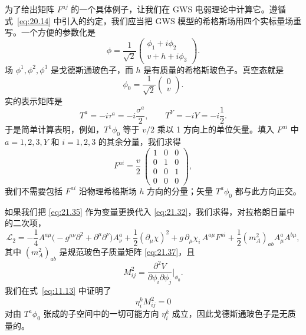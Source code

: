 为了给出矩阵 $F^{aj}$ 的一个具体例子，让我们在 GWS 电弱理论中计算它。遵循式~\eqref{eq:20.14} 中引入的约定，我们应当把 GWS 模型的希格斯场用四个实标量场重写。一个方便的参数化是
\begin{equation}
  \phi = \frac{1}{\sqrt{2}}\begin{pmatrix}
    \phi_1 + i\phi_2\\
    v + h + i\phi_3
  \end{pmatrix} .
  \label{eq:21.38}
\end{equation}
场 $\phi^1, \phi^2, \phi^3$ 是戈德斯通玻色子，而 $h$ 是有质量的希格斯玻色子。真空态就是
\begin{equation}
  \phi_0 = \frac{1}{\sqrt{2}}\begin{pmatrix}0\\ v\end{pmatrix} .
\end{equation}
实的表示矩阵是
\begin{equation}
  T^a = -i\tau^a = -i\frac{\sigma^a}{2},\qquad
  T^Y = -iY = -i\frac{1}{2} .
\end{equation}
于是简单计算表明，例如，$T^1\phi_0$ 等于 $v/2$ 乘以 1 方向上的单位矢量。填入 $F^{ai}$ 中 $a = 1, 2, 3, Y$ 和 $i = 1, 2, 3$ 的其余分量，我们求得
\begin{equation}
  F^{ai} = \frac{v}{2}\ \begin{pmatrix}
    1 & 0 & 0\\
    0 & 1 & 0\\
    0 & 0 & 1\\
    0 & 0 & 0
  \end{pmatrix},
  \label{eq:21.39}
\end{equation}
我们不需要包括 $F^{ai}$ 沿物理希格斯场 $h$ 方向的分量；矢量 $T^a\phi_0$ 都与此方向正交。

如果我们把 \eqref{eq:21.35} 作为变量更换代入 \eqref{eq:21.32}，我们求得，对拉格朗日量中的二次项，
\begin{equation}
  \mathcal{L}_2 = -\frac{1}{4}A^{a\mu}\bigl( -g^{\mu\nu}\partial^2
    + \partial^\mu\partial^\nu \bigr)A^a_\nu + \frac{1}{2}(\partial_\mu\chi)^2
    + g\,\partial_\mu\chi_i\,A^{a\mu}F^{ai}
    + \frac{1}{2}(m^2_A)_{ab}A^a_\mu A^{b\mu} ,
  \label{eq:21.40}
\end{equation}
其中 $(m^2_A)_{ab}$ 是规范玻色子质量矩阵 \eqref{eq:21.37}，且
\begin{equation}
  M^2_{ij} = \frac{\partial^2V}{\partial\phi_i\partial\phi_j}
    \Big|_{\phi_0} .
  \label{eq:21.41}
\end{equation}
我们在式~\eqref{eq:11.13} 中证明了
\begin{equation}
  \eta_i^k M^2_{ij} = 0
  \label{eq:21.42}
\end{equation}
对由 $T^a\phi_0$ 张成的子空间中的一切可能方向 $\eta_i^k$ 成立，因此戈德斯通玻色子是无质量的。

